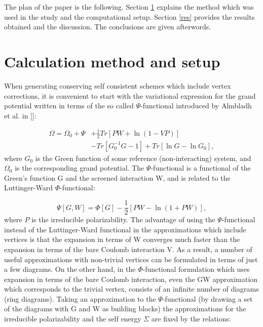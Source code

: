 \documentclass[aps,prb,floatfix,epsfig,twocolumn,preprintnumbers]{revtex4}
\begin{document}
The plan of the paper is the following. Section \ref{methods} explains the method which was used in the study and the computational setup. Section \ref{res} provides the results obtained and the discussion. The conclusions are given afterwords.

\section{Calculation method and setup}
\label{methods}

When generating conserving self consistent schemes which include vertex corrections, it is convenient to start with the variational expression for the grand potential written in terms of the so called $\Psi$-functional introduced by Almbladh et al. in []:


\begin{align}\label{om0}
\Omega=\Omega_{0}+\Psi&+\frac{1}{2}Tr[PW+\ln(1-VP)]\nonumber\\&-Tr[G^{-1}_{0}G-1]+Tr[\ln G-\ln G_{0}],
\end{align}
where $G_{0}$ is the Green function of some reference (non-interacting) system, and $\Omega_{0}$ is the corresponding grand potential. The $\Psi$-functional is a functional of the Green's function G and the screened interaction W, and is related to the Luttinger-Ward $\Phi$-functional\cite{pr_118_1417}:



\begin{equation}\label{om1a}
\Psi [G,W]=\Phi[G]-\frac{1}{2}[PW-\ln (1+PW)],
\end{equation}
where $P$ is the irreducible polarizability. The advantage of using the $\Psi$-functional instead of the Luttinger-Ward functional in the approximations which include vertices is that the expansion in terms of W converges much faster than the expansion in terms of the bare Coulomb interaction V. As a result, a number of useful approximations with non-trivial vertices can be formulated in terms of just a few diagrams. On the other hand, in the $\Phi$-functional formulation which uses expansion in terms of the bare Coulomb interaction, even the GW approximation which corresponds to the trivial vertex, consists of an infinite number of diagrams (ring diagrams). Taking an approximation to the $\Psi$-functional (by drawing a set of the diagrams with G and W as building blocks) the approximations for the irreducible polarizability and the self energy $\Sigma$ are fixed by the relations\cite{ijmpb_13_535}:
\end{document}
